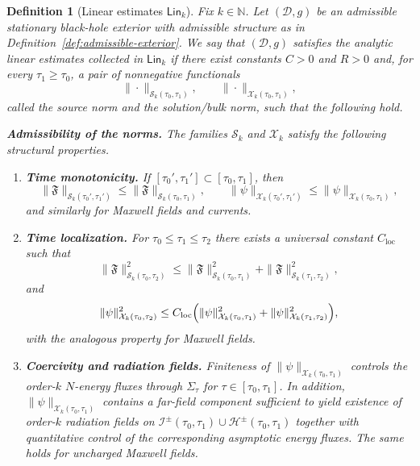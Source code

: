 \documentclass[10pt,a4paper]{amsart}
\newtheorem{definition}{Definition}
\newcommand{\Lin}{\mathsf{Lin}}
\begin{document}
\begin{definition}[Linear estimates $\Lin_{k}$]\label{def:lin-estimates}
Fix $k\in\mathbb N$.
Let $(\mathcal D,g)$ be an admissible stationary black-hole exterior with admissible structure as in Definition~\ref{def:admissible-exterior}.
We say that $(\mathcal D,g)$ satisfies the \emph{analytic} linear estimates collected in $\Lin_{k}$ if there exist constants $C>0$ and $R>0$ and, for every $\tau_{1}\ge\tau_{0}$, a pair of nonnegative functionals
\begin{equation}
\|\cdot\|_{\mathcal S_{k}(\tau_{0},\tau_{1})},\qquad
\|\cdot\|_{\mathcal X_{k}(\tau_{0},\tau_{1})},
\end{equation}
called the \emph{source norm} and the \emph{solution/bulk norm}, such that the following hold.

\smallskip
\noindent\textbf{Admissibility of the norms.}
The families $\mathcal S_{k}$ and $\mathcal X_{k}$ satisfy the following structural properties.
\begin{enumerate}
\item[(A1)] \textbf{Time monotonicity.}
If $[\tau_{0}',\tau_{1}']\subset[\tau_{0},\tau_{1}]$, then
\begin{equation}
\|\mathfrak{F}\|_{\mathcal S_{k}(\tau_{0}',\tau_{1}')} \le \|\mathfrak{F}\|_{\mathcal S_{k}(\tau_{0},\tau_{1})},
\qquad
\|\psi\|_{\mathcal X_{k}(\tau_{0}',\tau_{1}')} \le \|\psi\|_{\mathcal X_{k}(\tau_{0},\tau_{1})},
\end{equation}
and similarly for Maxwell fields and currents.
\item[(A2)] \textbf{Time localization.}
For $\tau_{0}\le\tau_{1}\le\tau_{2}$ there exists a universal constant $C_{\mathrm{loc}}$ such that
\begin{equation}
\|\mathfrak{F}\|_{\mathcal S_{k}(\tau_{0},\tau_{2})}^{2}
\le
\|\mathfrak{F}\|_{\mathcal S_{k}(\tau_{0},\tau_{1})}^{2}
+
\|\mathfrak{F}\|_{\mathcal S_{k}(\tau_{1},\tau_{2})}^{2},
\end{equation}
and
\begin{equation}
\|\psi\|_{\mathcal X_{k}(\tau_{0},\tau_{2})}^{2}
\le
C_{\mathrm{loc}}\Bigl(
\|\psi\|_{\mathcal X_{k}(\tau_{0},\tau_{1})}^{2}
+
\|\psi\|_{\mathcal X_{k}(\tau_{1},\tau_{2})}^{2}
\Bigr),
\end{equation}
with the analogous property for Maxwell fields.
\item[(A3)] \textbf{Coercivity and radiation fields.}
Finiteness of $\|\psi\|_{\mathcal X_{k}(\tau_{0},\tau_{1})}$ controls the order-$k$ $N$-energy fluxes through $\Sigma_{\tau}$ for $\tau\in[\tau_{0},\tau_{1}]$.
In addition, $\|\psi\|_{\mathcal X_{k}(\tau_{0},\tau_{1})}$ contains a far-field component sufficient to yield existence of order-$k$ radiation fields on $\mathcal I^{\pm}(\tau_{0},\tau_{1})\cup\mathcal H^{\pm}(\tau_{0},\tau_{1})$
together with quantitative control of the corresponding asymptotic energy fluxes.
The same holds for uncharged Maxwell fields.
\end{enumerate}


\end{definition}
\end{document}
